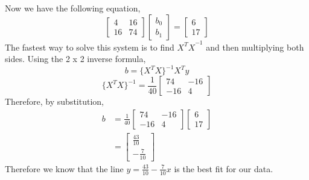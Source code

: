 \documentclass{amsart}
\begin{document}
Now we have the following equation,
\begin{equation*}
\begin{bmatrix}4&16\\ 16&74\end{bmatrix}\begin{bmatrix}b_0\\ b_1\end{bmatrix} = \begin{bmatrix}6\\ 17\end{bmatrix}
\end{equation*}
The fastest way to solve this system is to find ${X^TX}^{-1}$ and then multiplying both sides. Using the 2 x 2 inverse formula,
\begin{equation*}
b = \{X^TX\}^{-1}X^Ty
\end{equation*}
\begin{equation*}
\{X^TX\}^{-1} = \frac{1}{40}\begin{bmatrix}74&-16\\ -16&4\end{bmatrix}
\end{equation*}
Therefore, by substitution,
\begin{align*}
b &= \frac{1}{40}\begin{bmatrix}74&-16\\ -16&4\end{bmatrix}\begin{bmatrix}6\\ 17\end{bmatrix}\\
&= \begin{bmatrix}\frac{43}{10}\\ -\frac{7}{10}\end{bmatrix}
\end{align*}
Therefore we know that the line $y = \frac{43}{10} - \frac{7}{10}x$ is the best fit for our data.

\vspace{1in}
\end{document}
